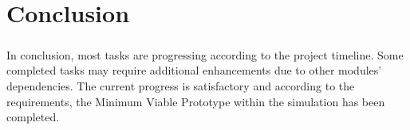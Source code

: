 \chapter{Conclusion}

\paragraph*{}
In conclusion, most tasks are progressing according to the project timeline. Some completed tasks may require additional enhancements due to other modules' dependencies. The current progress is satisfactory and according to the requirements, the Minimum Viable Prototype within the simulation has been completed.
